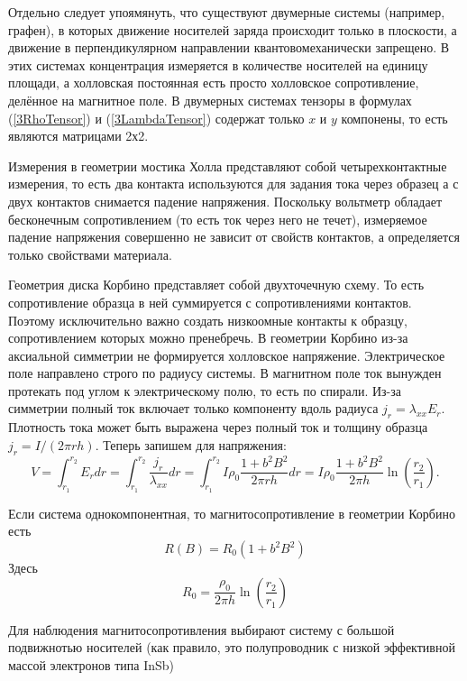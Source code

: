 Отдельно следует упоямянуть, что существуют двумерные системы (например, графен), в которых движение носителей заряда происходит только в плоскости, а движение в перпендикулярном направлении квантовомеханически запрещено. В этих системах концентрация измеряется в количестве носителей на единицу площади, а холловская постоянная есть просто холловское сопротивление, делённое на магнитное поле. В двумерных системах тензоры в формулах (\ref{3RhoTensor}) и (\ref{3LambdaTensor}) содержат только $x$ и $y$ компонены, то есть являются матрицами 2х2.

Измерения в геометрии мостика Холла представляют собой четырехконтактные измерения, то есть два контакта используются для задания тока через образец а с двух контактов снимается падение напряжения. Поскольку вольтметр обладает бесконечным сопротивлением (то есть ток через него не течет), измеряемое падение напряжения совершенно не зависит от свойств контактов, а определяется только свойствами материала.

Геометрия диска Корбино представляет собой двухточечную схему. То есть сопротивление образца в ней суммируется с сопротивлениями контактов. Поэтому исключительно важно создать низкоомные контакты к образцу, сопротивлением которых можно пренебречь. В геометрии Корбино из-за аксиальной симметрии не формируется холловское напряжение. Электрическое поле направлено строго по радиусу системы. В магнитном поле ток вынужден протекать под углом к электрическому полю, то есть по спирали. Из-за симметрии полный ток включает только компоненту вдоль радиуса $j_r=\lambda_{xx} E_r$. Плотность тока может быть выражена через полный ток и толщину образца $j_r=I/(2\pi rh)$. Теперь запишем для напряжения:
$$V=\int_{r_1}^{r_2}E_r dr=\int_{r_1}^{r_2}\frac{j_r}{\lambda_{xx}}d r=\int_{r_1}^{r_2}I\rho_{0}\frac{1+b^2B^2}{2\pi rh}dr=I\rho_{0}\frac{1+b^2B^2}{2\pi h}\ln\left(\frac{r_2}{r_1}\right).$$

Если система однокомпонентная, то магнитосопротивление в геометрии Корбино есть
 \begin{equation}
    R(B)=R_0(1+b^2B^2)
      \label{3MagnetoSoprot}
      \end{equation}
 Здесь
 \begin{equation}
    R_0=\frac{\rho_{0}}{2\pi h}\ln\left(\frac{r_2}{r_1}\right)
      \label{3KorbinoSoprot}
      \end{equation}

    
 Для наблюдения магнитосопротивления выбирают систему с  большой подвижнотью носителей (как правило, это полупроводник с низкой эффективной массой электронов типа InSb)

